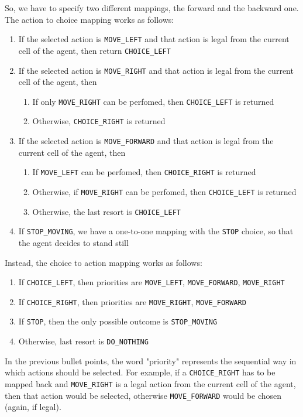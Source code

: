 \documentclass[a4paper,10pt]{report}
\begin{document}
So, we have to specify two different mappings, the forward and the backward one. The action to choice mapping works as follows:
\begin{enumerate}
	\item If the selected action is \texttt{MOVE_LEFT} and that action is legal from the current cell of the agent, then return \texttt{CHOICE_LEFT}
	\item If the selected action is \texttt{MOVE_RIGHT} and that action is legal from the current cell of the agent, then
	\begin{enumerate}
		\item If only \texttt{MOVE_RIGHT} can be perfomed, then \texttt{CHOICE_LEFT} is returned
		\item Otherwise, \texttt{CHOICE_RIGHT} is returned
	\end{enumerate}
	\item If the selected action is \texttt{MOVE_FORWARD} and that action is legal from the current cell of the agent, then
	\begin{enumerate}
		\item If \texttt{MOVE_LEFT} can be perfomed, then \texttt{CHOICE_RIGHT} is returned
		\item Otherwise, if \texttt{MOVE_RIGHT} can be perfomed, then \texttt{CHOICE_LEFT} is returned
		\item Otherwise, the last resort is \texttt{CHOICE_LEFT}
	\end{enumerate}
	\item If \texttt{STOP_MOVING}, we have a one-to-one mapping with the \texttt{STOP} choice, so that the agent decides to stand still
\end{enumerate}

Instead, the choice to action mapping works as follows:
\begin{enumerate}
	\item If \texttt{CHOICE_LEFT}, then priorities are \texttt{MOVE_LEFT}, \texttt{MOVE_FORWARD}, \texttt{MOVE_RIGHT}
	\item If \texttt{CHOICE_RIGHT}, then priorities are \texttt{MOVE_RIGHT}, \texttt{MOVE_FORWARD}
	\item If \texttt{STOP}, then the only possible outcome is \texttt{STOP_MOVING}
	\item Otherwise, last resort is \texttt{DO_NOTHING}
\end{enumerate}

In the previous bullet points, the word "priority" represents the sequential way in which actions should be selected. For example, if a \texttt{CHOICE_RIGHT} has to be mapped back and \texttt{MOVE_RIGHT} is a legal action from the current cell of the agent, then that action would be selected, otherwise \texttt{MOVE_FORWARD} would be chosen (again, if legal).
\end{document}
